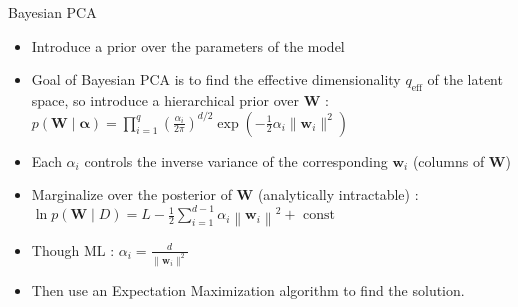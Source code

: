 \documentclass[fleqn]{beamer}
\begin{document}
\begin{frame}{Bayesian PCA\cite{bishop1999bayesian}}
    \begin{itemize}
        \item Introduce a prior over the parameters of the model 
        \item Goal of Bayesian PCA is to find the effective dimensionality $q_{\text{eff}}$ of the latent space, so introduce a hierarchical prior over $\mathbf{W}$ : $p(\mathbf{W} \mid \mathbf{\alpha}) = \prod_{i=1}^q (\frac{\alpha_i}{2 \pi})^{d/2} \exp(-\frac{1}{2} \alpha_i \| \mathbf{w}_i\|^2)$
        \item Each $\alpha_i$ controls the inverse variance of the corresponding $\mathbf{w}_i$ (columns of $\mathbf{W}$)
        \item Marginalize over the posterior of $\mathbf{W}$ (analytically intractable) : $\ln p(\mathbf{W} \mid D)=L-\frac{1}{2} \sum_{i=1}^{d-1} \alpha_{i}\left\|\mathbf{w}_{i}\right\|^{2}+\text { const }$
        \item Though ML : $\alpha_i = \frac{d}{\|\mathbf{w}_i\|^2}$
        \item Then use an Expectation Maximization algorithm to find the solution.
    \end{itemize}
\end{frame}
\end{document}
